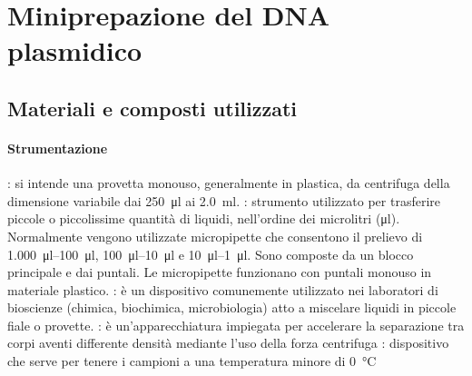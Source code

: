 \section{Miniprepazione del DNA plasmidico}\label{sec:miniprep}

\subsection{Materiali e composti utilizzati}
\paragraph{Strumentazione}
\begin{itemize}[person]
	: si intende una provetta monouso, generalmente in plastica, da centrifuga della dimensione variabile dai \qty{250}{\micro\litre} ai \qty{2.0}{\ml}.
	\itemb[Micropipette]: strumento utilizzato per trasferire piccole o piccolissime quantità di liquidi, nell'ordine dei microlitri (\unit{\micro\litre}). Normalmente vengono utilizzate micropipette che consentono il prelievo di \qtyrange{1.000}{100}{\micro\litre}, \qtyrange{100}{10}{\micro\litre} e \qtyrange{10}{1}{\micro\litre}. Sono composte da un blocco principale e dai puntali. Le micropipette funzionano con puntali monouso in materiale plastico.
	: è un dispositivo comunemente utilizzato nei laboratori di bioscienze (chimica, biochimica, microbiologia) atto a miscelare liquidi in piccole fiale o provette. 
	\itemb[Centrifuga]: è un'apparecchiatura impiegata per accelerare la separazione tra corpi aventi differente densità mediante l'uso della forza centrifuga
	\itemb[Freezer]: dispositivo che serve per tenere i campioni a una temperatura minore di \qty{0}{\celsius}
\end{itemize}

